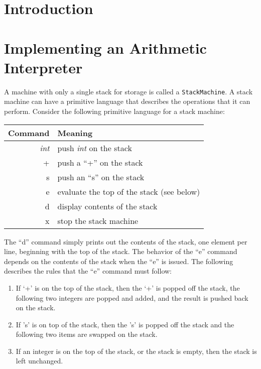 


\usepackage[compact]{titlesec}


\section*{Introduction}

\section*{Implementing an Arithmetic Interpreter}

A machine with only a single stack for storage is called a \texttt{StackMachine}. A stack machine can have a primitive
language that describes the operations that it can perform. Consider the following primitive language for a stack
machine:

\begin{tabular}{r | l}
Command & Meaning \\ \hline
\emph{int} & push \emph{int} on the stack \\
+ & push a ``+'' on the stack \\
s & push an ``s'' on the stack \\
e & evaluate the top of the stack (see below) \\
d & display contents of the stack \\
x & stop the stack machine \\ 
\end{tabular}

The ``d'' command simply prints out the contents of the stack, one element
per line, beginning with the top of the stack. The behavior of the ``e''
command depends on the contents of the stack when the ``e'' is issued. The
following describes the rules that the ``e'' command must follow:

\begin{enumerate}
\item
  If `+' is on the top of the stack, then the `+' is popped off the
  stack, the following two integers are popped and added, and the result
  is pushed back on the stack.
\item
  If 's' is on top of the stack, then the 's' is popped off the stack
  and the following two items are swapped on the stack.
\item
  If an integer is on the top of the stack, or the stack is empty, then
  the stack is left unchanged.
\end{enumerate}

